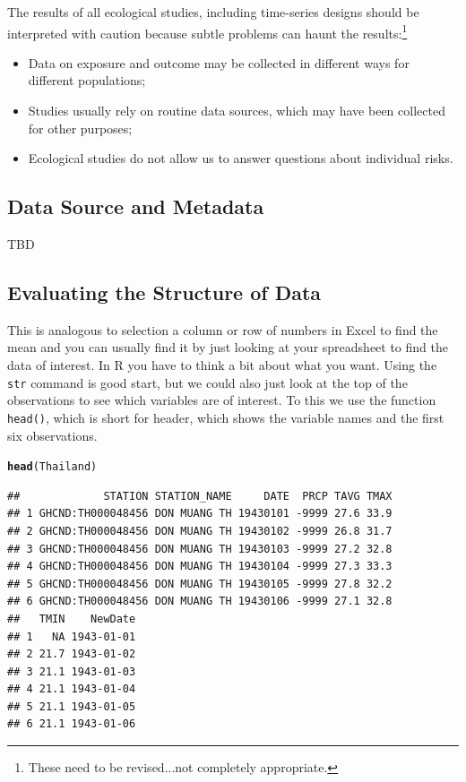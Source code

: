 \documentclass{article}\usepackage[]{graphicx}\usepackage[]{color}
\makeatletter
\newcommand{\hlstd}[1]{\textcolor[rgb]{0.345,0.345,0.345}{#1}}%
\newcommand{\hlkwd}[1]{\textcolor[rgb]{0.737,0.353,0.396}{\textbf{#1}}}%
\newenvironment{kframe}{%
 \def\at@end@of@kframe{}%
 \ifinner\ifhmode%
  \def\at@end@of@kframe{\end{minipage}}%
  \begin{minipage}{\columnwidth}%
 \fi\fi%
 \def\FrameCommand##1{\hskip\@totalleftmargin \hskip-\fboxsep
 \colorbox{shadecolor}{##1}\hskip-\fboxsep
     \hskip-\linewidth \hskip-\@totalleftmargin \hskip\columnwidth}%
 \MakeFramed {\advance\hsize-\width
   \@totalleftmargin\z@ \linewidth\hsize
   \@setminipage}}%
 {\par\unskip\endMakeFramed%
 \at@end@of@kframe}
\newenvironment{knitrout}{}{} %
\makeatother
\begin{document}
The results of all ecological studies, including time-series designs should be interpreted with caution because subtle problems can haunt the results:\footnote{These need to be revised...not completely appropriate.}

\begin{itemize}
  \item Data on exposure and outcome may be collected in different ways for different populations;
  \item Studies usually rely on routine data sources, which may have been collected for other purposes;
  \item Ecological studies do not allow us to answer questions about individual risks.
\end{itemize}

\subsection{Data Source and Metadata}

TBD

\subsection{Evaluating the Structure of Data}



This is analogous to selection a column or row of numbers in Excel to find the mean and you can usually find it by just looking at your spreadsheet to find the data of interest. In R you have to think a bit about what you want. Using the \texttt{str} command is good start, but we could also just look at the top of the observations to see which variables are of interest. To this we use the function \texttt{head()}, which is short for header, which shows the variable names and the first six observations.

\begin{knitrout}
\color{fgcolor}\begin{kframe}
\begin{alltt}
\hlkwd{head}\hlstd{(Thailand)}
\end{alltt}
\begin{verbatim}
##             STATION STATION_NAME     DATE  PRCP TAVG TMAX
## 1 GHCND:TH000048456 DON MUANG TH 19430101 -9999 27.6 33.9
## 2 GHCND:TH000048456 DON MUANG TH 19430102 -9999 26.8 31.7
## 3 GHCND:TH000048456 DON MUANG TH 19430103 -9999 27.2 32.8
## 4 GHCND:TH000048456 DON MUANG TH 19430104 -9999 27.3 33.3
## 5 GHCND:TH000048456 DON MUANG TH 19430105 -9999 27.8 32.2
## 6 GHCND:TH000048456 DON MUANG TH 19430106 -9999 27.1 32.8
##   TMIN    NewDate
## 1   NA 1943-01-01
## 2 21.7 1943-01-02
## 3 21.1 1943-01-03
## 4 21.1 1943-01-04
## 5 21.1 1943-01-05
## 6 21.1 1943-01-06
\end{verbatim}
\end{kframe}
\end{knitrout}
\end{document}
